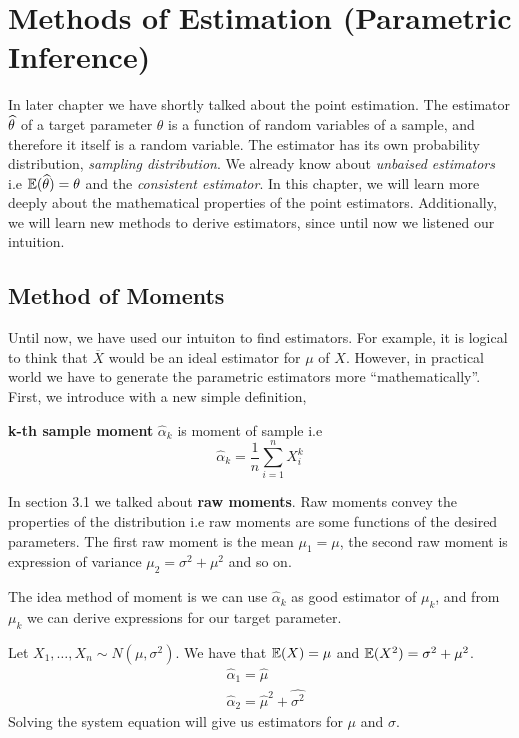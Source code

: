 \chapter{Methods of Estimation (Parametric Inference)}
In later chapter we have shortly talked about the point estimation. The estimator ${\widehat{\theta}}$ of a target parameter $\theta$ is a function of random variables of a sample, and therefore it itself is a random variable.
The estimator has its own probability distribution, \textit{sampling distribution}. We already know about \textit{unbaised estimators} i.e ${\mathbb{E}}({\widehat{\theta}}) = \theta$ and the \textit{consistent estimator}. In this chapter, we will learn more deeply about the mathematical properties of the point estimators. Additionally, we will learn new methods to derive estimators, since until now we listened our intuition.
\section{Method of Moments}
Until now, we have used our intuiton to find estimators. For example, it is logical to think that $\overline{X}$ would be an ideal estimator for $\mu$ of $X$. However, in practical world we have to generate the parametric estimators more ``mathematically''.
First, we introduce with a new simple definition,
\begin{definition}
    \textbf{k-th sample moment} $\widehat{\alpha}_k$ is moment of sample i.e 
    \[\widehat{\alpha}_k = \frac{1}{n} \sum_{i = 1}^n X_{i}^k \]
\end{definition}
In section 3.1 we talked about \textbf{raw moments}. Raw moments convey the properties of the distribution i.e raw moments are some functions of the desired parameters. The first raw moment is the mean $\mu_1 = \mu$, the second raw moment is expression of variance  $\mu_{2}= \sigma^2+ \mu^2$ and so on.

The idea method of moment is  we can use $\widehat{\alpha}_k$ as good estimator of $\mu_k$, and from $\mu_k$ we can derive expressions for our target parameter.

\begin{example}
Let $X_1, \ldots, X_n \sim N(\mu, \sigma^2)$. We have that ${\mathbb{E}}(X) = \mu$ and ${\mathbb{E}}(X^2) = \sigma^2 + \mu^2$.
\begin{align*}
    &\widehat{\alpha}_1 = \widehat{\mu} \\
    &\widehat{\alpha}_2 = \widehat{\mu}^2 + \widehat{\sigma^2}
\end{align*}
Solving the system equation will give us estimators for $\mu$ and $\sigma$.

\end{example}


